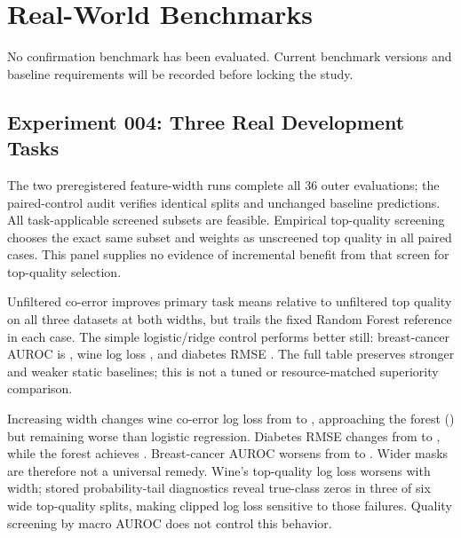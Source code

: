 \section{Real-World Benchmarks}
No confirmation benchmark has been evaluated. Current benchmark versions and
baseline requirements will be recorded before locking the study.

\subsection{Experiment 004: Three Real Development Tasks}

The two preregistered feature-width runs complete all 36 outer evaluations;
the paired-control audit verifies identical splits and unchanged baseline
predictions. All task-applicable screened subsets are feasible. Empirical
top-quality screening chooses the exact same subset and weights as unscreened
top quality in all \ExpFourSameTopSubsets{} paired cases. This panel supplies
no evidence of incremental benefit from that screen for top-quality selection.


Unfiltered co-error improves primary task means relative to unfiltered top
quality on all three datasets at both widths, but trails the fixed Random Forest
reference in each case. The simple logistic/ridge control performs better still:
breast-cancer AUROC is \ExpFourCancerLinearNarrow{}, wine log loss
\ExpFourWineLinearNarrow{}, and diabetes RMSE \ExpFourDiabetesLinearNarrow{}.
The full table preserves stronger and weaker static baselines; this is not a
tuned or resource-matched superiority comparison.

Increasing width changes wine co-error log loss from
\ExpFourWineCoerrorNarrow{} to \ExpFourWineCoerrorWide{}, approaching the forest
(\ExpFourWineForestNarrow{}) but remaining worse than logistic regression.
Diabetes RMSE changes from \ExpFourDiabetesCoerrorNarrow{} to
\ExpFourDiabetesCoerrorWide{}, while the forest achieves
\ExpFourDiabetesForestNarrow{}. Breast-cancer AUROC worsens from
\ExpFourCancerCoerrorNarrow{} to \ExpFourCancerCoerrorWide{}.
Wider masks are therefore not a universal remedy. Wine's top-quality log loss
worsens with width; stored probability-tail diagnostics reveal true-class zeros
in three of six wide top-quality splits, making clipped log loss sensitive to
those failures. Quality screening by macro AUROC does not control this behavior.

